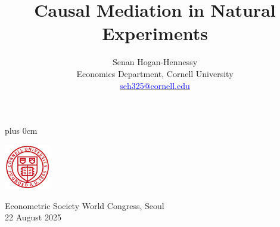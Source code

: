 \documentclass[dvipsnames]{beamer} %
\title{\color{titleText}
    Causal Mediation in Natural Experiments
}
\author[Senan Hogan-Hennessy, Cornell University]{
    Senan Hogan-Hennessy \\
    Economics Department, Cornell University \\ %
    \href{mailto:seh325@cornell.edu}{\textcolor{blue}{seh325@cornell.edu}}
}
\date{} %
\renewcommand{\raggedright}{\leftskip=0pt \rightskip=0pt plus 0cm}
\begin{document}
\raggedright
\begin{frame}
    \titlepage
    \vspace{-1.5cm}
    \begin{center}
        \includegraphics[width=2cm]{presentation-files/cornell}

        \vspace{0.5cm}
        Econometric Society World Congress, Seoul \\
        22 August 2025
    \end{center}
\end{frame}

\end{document}
